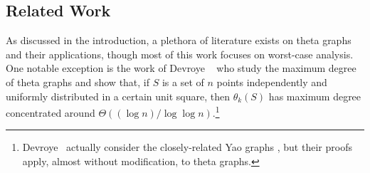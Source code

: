 \documentclass{patmorin}
\begin{document}
\subsection{Related Work}

As discussed in the introduction, a plethora of literature exists on
theta graphs and their applications, though most of this work focuses on
worst-case analysis.  One notable exception is the work of Devroye \etal\
\cite{devroye.gudmundsson.ea:on} who study the maximum degree of theta
graphs and show that, if $S$ is a set of $n$ points independently and
uniformly distributed in a certain unit square, then $\theta_k(S)$
has maximum degree concentrated around $\Theta((\log n)/\log\log
n)$.\footnote{Devroye \etal\ actually consider the closely-related Yao graphs
\cite{flinchbaugh.jones:strong,yao:on}, but their proofs apply,
almost without modification, to theta graphs.}
\end{document}
